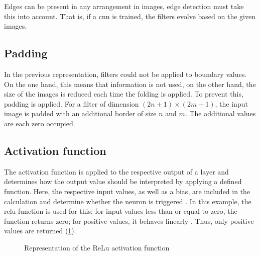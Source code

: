 {Edges can be present in any arrangement in images, edge detection must take this into account. That is, if a \ac{cnn} is trained, the filters evolve based on the given images. 



\subsection{Padding}

In the previous representation, filters could not be applied to boundary values. On the one hand, this means that information is not used, on the other hand, the size of the images is reduced each time the folding is applied. To prevent this, padding is applied. For a filter of dimension $(2n+1) \times (2m+1)$, the input image is padded with an additional border of size
$n$ and $m$. The additional values are each zero occupied.



\subsection{Activation function}\label{subsec:activation}

The activation function is applied to the respective output of a layer and determines how the output value should be interpreted by applying a defined function. Here, the respective input values, as well as a bias, are included in the calculation and determine whether the neuron is triggered \cite{Nwankpa:2018}. In this example, the \ac{relu} function is used for this: for input values less than or equal to zero, the function returns zero; for positive values, it behaves linearly \cite{Agarap:2018}. Thus, only positive values are returned (\cref{fig:relu}).

\begin{figure}
    \centering
    \caption{Representation of the ReLu activation function}
    \label{fig:relu}
\end{figure}

}
